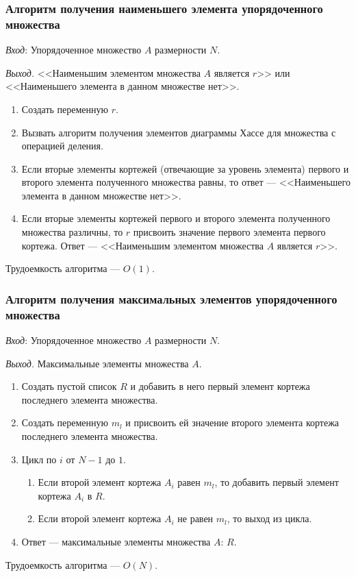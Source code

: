 \documentclass[bachelor, och, labwork]{shiza}
\begin{document}
\subsubsection{Алгоритм получения наименьшего элемента упорядоченного множества}
\textit{Вход}: Упорядоченное множество $A$ размерности $N$.

\textit{Выход.} <<Наименьшим элементом множества $A$ является $r$>> 
или <<Наименьшего элемента в данном множестве нет>>.
\begin{enumerate}
    \item Создать переменную $r$.
    \item Вызвать алгоритм получения элементов диаграммы Хассе для множества с операцией деления.
    \item Если вторые элементы кортежей (отвечающие за уровень элемента) первого
    и второго элемента полученного множества равны, то ответ --- <<Наименьшего элемента в данном множестве нет>>.
    \item Если вторые элементы кортежей первого и второго элемента полученного 
    множества различны, то $r$ присвоить значение первого элемента первого кортежа.
    Ответ --- <<Наименьшим элементом множества $A$ является $r$>>.
\end{enumerate}
Трудоемкость алгоритма --- $O(1)$.

\subsubsection{Алгоритм получения максимальных элементов упорядоченного множества}
\textit{Вход}: Упорядоченное множество $A$ размерности $N$.

\textit{Выход.} Максимальные элементы множества $A$.
\begin{enumerate}
    \item Создать пустой список $R$ и добавить в него первый элемент кортежа
    последнего элемента множества.
    \item Создать переменную $m_l$ и присвоить ей значение второго элемента кортежа
    последнего элемента множества.
    \item Цикл по $i$ от $N-1$ до $1$.
        \begin{enumerate}
            \item Если второй элемент кортежа $A_i$ равен $m_l$, то добавить
            первый элемент кортежа $A_i$ в $R$.
            \item Если второй элемент кортежа $A_i$ не равен $m_l$, то выход из цикла.
        \end{enumerate}
    \item Ответ --- максимальные элементы множества $A$: $R$.
\end{enumerate}
Трудоемкость алгоритма --- $O(N)$.
\end{document}
